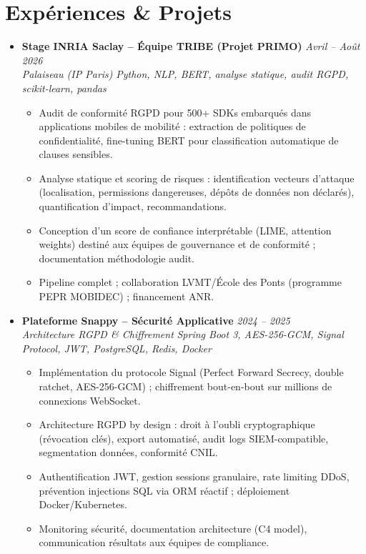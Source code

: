 \documentclass[a4paper,11pt]{article}
\begin{document}
\section{Exp\'eriences \& Projets}
\begin{itemize}[leftmargin=*, label={-}]
    \item \textbf{Stage INRIA Saclay -- \'Equipe TRIBE (Projet PRIMO)} \hfill \textit{Avril -- Ao\^ut 2026} \\
    \textit{Palaiseau (IP Paris)} \hfill \textit{Python, NLP, BERT, analyse statique, audit RGPD, scikit-learn, pandas}
    \vspace{-2pt}
    \begin{itemize}[leftmargin=0.4cm, nosep, label=\tiny$\bullet$]
        \item \small{Audit de conformité RGPD pour 500+ SDKs embarqués dans applications mobiles de mobilité : extraction de politiques de confidentialité, fine-tuning BERT pour classification automatique de clauses sensibles.}
        \item \small{Analyse statique et scoring de risques : identification vecteurs d'attaque (localisation, permissions dangereuses, dépôts de données non déclarés), quantification d'impact, recommandations.}
        \item \small{Conception d'un score de confiance interprétable (LIME, attention weights) destiné aux équipes de gouvernance et de conformité ; documentation méthodologie audit.}
        \item \small{Pipeline complet ; collaboration LVMT/École des Ponts (programme PEPR MOBIDEC) ; financement ANR.}
    \end{itemize}
    \vspace{3pt}

    \item \textbf{Plateforme Snappy -- Sécurité Applicative} \hfill \textit{2024 -- 2025} \\
    \textit{Architecture RGPD \& Chiffrement} \hfill \textit{Spring Boot 3, AES-256-GCM, Signal Protocol, JWT, PostgreSQL, Redis, Docker}
    \vspace{-2pt}
    \begin{itemize}[leftmargin=0.4cm, nosep, label=\tiny$\bullet$]
        \item \small{Implémentation du protocole Signal (Perfect Forward Secrecy, double ratchet, AES-256-GCM) ; chiffrement bout-en-bout sur millions de connexions WebSocket.}
        \item \small{Architecture RGPD by design : droit à l'oubli cryptographique (révocation clés), export automatisé, audit logs SIEM-compatible, segmentation données, conformité CNIL.}
        \item \small{Authentification JWT, gestion sessions granulaire, rate limiting DDoS, prévention injections SQL via ORM réactif ; déploiement Docker/Kubernetes.}
        \item \small{Monitoring sécurité, documentation architecture (C4 model), communication résultats aux équipes de compliance.}
    \end{itemize}
    \vspace{3pt}


\end{itemize}
\end{document}
